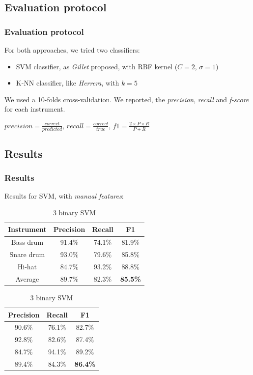 \documentclass{beamer}
\begin{document}
    \subsection{Evaluation protocol}
    \begin{frame}
        \frametitle{Evaluation protocol}
        For both approaches, we tried two classifiers:
        \begin{itemize}
            \item SVM classifier, as \emph{Gillet} proposed, with RBF kernel ($C=2$, $\sigma=1$) 
            \item K-NN classifier, like \emph{Herrera}, with $k=5$
        \end{itemize}
        \vspace{0.5cm}
      
        We used a 10-folds cross-validation.
        We reported, the \emph{precision}, \emph{recall} and \emph{f-score} for each instrument.
        \vspace{0.5cm}
        
        $precision=\frac{correct}{predicted}$,
        $recall=\frac{correct}{true}$,
        $f1=\frac{2\times P\times R}{P+R}$
    \end{frame}
    \subsection{Results}
    \begin{frame}
        \frametitle{Results}
        Results for SVM, with \emph{manual features}:
        \begin{center}
        \footnotesize 
        \begin{table}
        \parbox{.50\linewidth}{       
        \caption{Single SVM}
        \begin{tabular}{|c|c|c|c|}
        \hline
        Instrument&Precision&Recall&F1\\
        \hline
        Bass drum&91.4\%&74.1\%&81.9\%\\
        \hline
        Snare drum&93.0\%&79.6\%&85.8\%\\
        \hline
        Hi-hat&84.7\%&93.2\%&88.8\%\\
        \hline
        Average&89.7\%&82.3\%&\textbf{85.5\%}\\
        \hline
        \end{tabular}
        }
        \hfill
        \parbox{.40\linewidth}{
        \caption{3 binary SVM}
        \begin{tabular}{|c|c|c|}
        \hline
        Precision&Recall&F1\\
        \hline
        90.6\%&76.1\%&82.7\%\\
        \hline
        92.8\%&82.6\%&87.4\%\\
        \hline
        84.7\%&94.1\%&89.2\%\\
        \hline
        89.4\%&84.3\%&\textbf{86.4\%}\\
        \hline
        \end{tabular}
        }
        \end{table}

        \end{center}
    \end{frame}
    
\end{document}

